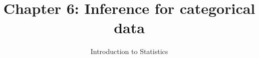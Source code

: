 \documentclass[slidestop,compress,mathserif]{beamer}
\title[Chp 6: Inference for categorical data]{Chapter 6: Inference for categorical data}
\author{Introduction to Statistics}
\date{}
\institute{}
\begin{document}


\begin{frame}[plain]

\titlepage

\end{frame}











\end{document}
